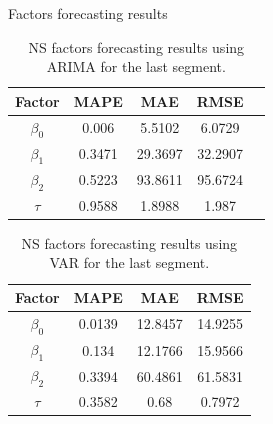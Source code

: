 \documentclass[aspectratio=169]{beamer}
\begin{document}
    \begin{frame}{Factors forecasting results}
        \begin{table}[H]
        \begin{center}
            \begin{tabular}{|c|c|c|c|c|}
                \hline
            Factor    &  MAPE         & MAE         & RMSE          \\ \hline
            $\beta_0$ &  0.006        & 5.5102      & 6.0729        \\ \hline 
            $\beta_1$ &  0.3471       & 29.3697     & 32.2907       \\ \hline 
            $\beta_2$ &  0.5223       & 93.8611     & 95.6724       \\ \hline 
            $\tau$    &  0.9588       & 1.8988      & 1.987         \\ \hline
            \end{tabular}
        \end{center}
        \caption{NS factors forecasting results using ARIMA for the last segment.}
    \end{table} 
    \begin{table}[H]
        \begin{center}
            \begin{tabular}{|c|c|c|c|}
                \hline
            Factor    &  MAPE         & MAE         & RMSE          \\ \hline
    
            $\beta_0$ &  0.0139       & 12.8457     & 14.9255       \\ \hline 
            $\beta_1$ &  0.134        &  12.1766    &  15.9566      \\ \hline 
            $\beta_2$ &  0.3394       & 60.4861     &  61.5831      \\ \hline 
            $\tau$    &  0.3582       &  0.68       &  0.7972       \\ \hline
            \end{tabular}
            \caption{NS factors forecasting results using VAR for the last segment.}
        \end{center}
    \end{table} 



    \end{frame}
\end{document}
